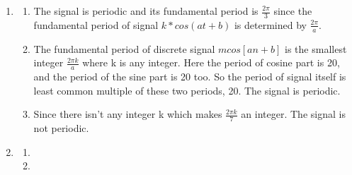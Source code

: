 \documentclass[10pt,a4paper, margin=1in]{article}
\begin{document}
\begin{enumerate}
    \item %
          \begin{enumerate}
              \item The signal is periodic and its fundamental period is $\frac{2 \pi}{3}$ since the fundamental
                    period of signal $k*cos(at+b)$ is determined by $\frac{2 \pi}{a}$.
              \item The fundamental period of discrete signal $mcos[an+b]$ is the smallest integer $\frac{2\pi k }{a}$ where k is any integer. Here the period of cosine part is 20, and the period of the sine part is 20 too. So the period of signal itself is least common multiple of these two periods, 20. The signal is periodic.
              \item Since there isn't any integer k which makes $\frac{2\pi k}{7}$ an integer. The signal is not periodic.
          \end{enumerate}

    \item %
          \begin{enumerate}
              \item %
              \item %
          \end{enumerate}


\end{enumerate}
\end{document}
